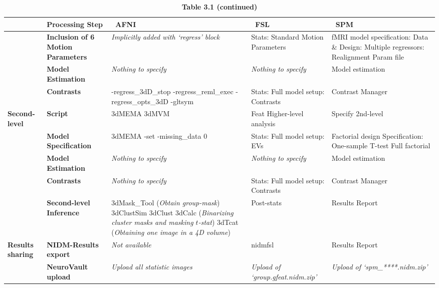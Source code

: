 \begin{table}[htbp]
\caption*{\textbf{Table 3.1 (continued)}}
\centering
\footnotesize
\hspace*{-1.5cm}
\begin{tabular}{@{}p{}*{4}{L{\tabcolsep\relax}}@{}}
\toprule
& \textbf{Processing Step} & \ \textbf{AFNI} & \ \textbf{FSL} & \ \textbf{SPM} \\
\midrule
& \textbf{Inclusion of 6 Motion Parameters} & \textit{Implicitly added with `regress' block} & Stats: Standard Motion Parameters & fMRI model specification: Data \& Design: Multiple regressors: Realignment Param file \\
\cmidrule(lr){2-5}
& \textbf{Model Estimation} & \textit{Nothing to specify} & \textit{Nothing to specify} & Model estimation\\
 \cmidrule(lr){2-5}
 & \textbf{Contrasts} & -regress\_3dD\_stop -regress\_reml\_exec -regress\_opts\_3dD -gltsym & Stats: Full model setup: Contrasts & Contrast Manager \\
 \midrule
 \textbf{Second-level} & \textbf{Script} & 3dMEMA \linebreak 3dMVM & Feat Higher-level analysis & Specify 2nd-level\\
 \cmidrule(lr){2-5}
 & \textbf{Model Specification} & 3dMEMA \linebreak -set \linebreak -missing\_data 0 & Stats: Full model setup: EVs & Factorial design Specification: One-sample T-test \linebreak Full factorial \\
  \cmidrule(lr){2-5}
& \textbf{Model Estimation} & \textit{Nothing to specify} & \textit{Nothing to specify} & Model estimation \\
\cmidrule(lr){2-5}
& \textbf{Contrasts} & \textit{Nothing to specify} & Stats: Full model setup: Contrasts & Contrast Manager \\
\cmidrule(lr){2-5}
& \textbf{Second-level Inference} & 3dMask\_Tool (\textit{Obtain group-mask}) \linebreak 3dClustSim \linebreak 3dClust \linebreak 3dCalc (\textit{Binarizing cluster masks and masking $t$-stat}) \linebreak 3dTcat (\textit{Obtaining one image in a 4D volume}) & Post-stats & Results Report \\
\midrule
\textbf{Results sharing} & \textbf{NIDM-Results export} & \textit{Not available} & nidmfsl & Results Report \\
\cmidrule(lr){2-5}
& \textbf{NeuroVault upload} & \textit{Upload all statistic images} & \textit{Upload of `group.gfeat.nidm.zip'} & \textit{Upload of `spm\_****.nidm.zip'}\\
\bottomrule
\end{tabular}
\end{table}

